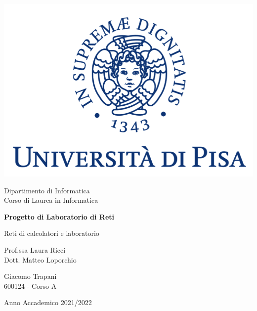 \documentclass[11pt, italian, openany]{book}
\begin{document}
\begin{sloppypar}
\begin{titlepage}
	\clearpage\thispagestyle{empty}
	\centering
	\vspace{1cm}

    \includegraphics[scale=0.60]{images/unipi-logo.png}
    
	{\normalsize \noindent Dipartimento di Informatica \\
	             Corso di Laurea in Informatica \par}
	
	\vspace{2cm}
	{\Huge \textbf{Progetto di Laboratorio di Reti} \par}
	\vspace{1cm}
	{\large Reti di calcolatori e laboratorio}
	\vspace{5cm}

    \begin{minipage}[t]{0.47\textwidth}
    	{\large{ Prof.ssa Laura Ricci \\ Dott. Matteo Loporchio}}
    \end{minipage}\hfill\begin{minipage}[t]{0.47\textwidth}\raggedleft
    	{\large {Giacomo Trapani \\ 600124 - Corso A\\ }}
    \end{minipage}

    \vspace{4cm}

	{\normalsize Anno Accademico 2021/2022 \par}

	\pagebreak
\end{titlepage}

\end{sloppypar}
\end{document}
